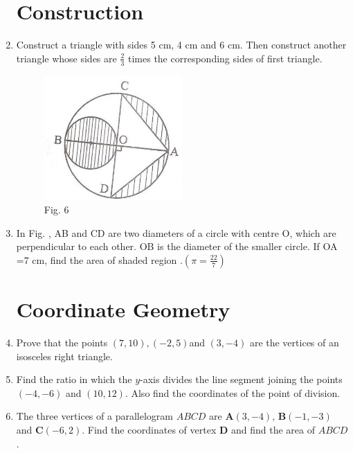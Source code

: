 \documentclass[10pt,-letter paper]{article}
\let\vec\mathbf{}
\let\vec\mathbf{}
\let\vec\mathbf{}
\providecommand{\brak}[1]{\ensuremath{\left(#1\right)}}
\begin{document}
\begin{enumerate}
 \section{Construction}
\item Construct a triangle with sides 5 cm, 4 cm and 6 cm. Then construct another triangle whose sides are $\frac{2}{3}$ times the corresponding sides of first triangle.
\begin{figure}
		\centering
\includegraphics[width=0.5\columnwidth]{6.png}
\caption{Fig. 6}
\label{fig6}
	\end{figure}
\item In Fig. , AB and CD are two diameters of a circle with centre O, which are perpendicular to each other. OB is the diameter of the smaller circle. If OA =7 cm, find the area of shaded region .$\brak{ \pi = \frac{22}{7}}$\\
	
\section{Coordinate Geometry}
\item Prove that the points $(7, 10), (-2, 5) $and $(3, -4)$ are the vertices of an isosceles right triangle.
\item Find the ratio in which the $y$-axis divides the line segment joining the points $(-4,-6)$ and $(10,12)$. Also find the coordinates of the point of division.


\item The three vertices of a parallelogram $ABCD$ are $\vec{A}(3, -4)$, $\vec{B}(-1, -3)$ and $\vec{C}(-6, 2)$. Find the coordinates of vertex $\vec{D}$ and find the area of $ABCD$.
\setcounter{figure}{1}
\end{enumerate}
\end{document}

